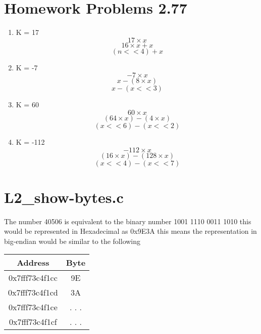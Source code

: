 \documentclass[11pt]{article}
\begin{document}
\section{Homework Problems 2.77}
    \begin{enumerate}
        \item K = 17 \newline
            $$17 \times x$$
            $$ 16 \times x + x $$
            $$ (n << 4) + x $$
        \item K = -7
            $$ -7 \times x $$
            $$ x - (8 \times x) $$
            $$ x - (x << 3) $$
        \item K = 60
            $$ 60 \times x $$
            $$ (64 \times x) - (4 \times x) $$
            $$ (x << 6) - (x << 2) $$
        \item K = -112
            $$ -112 \times x $$
            $$ (16 \times x) - (128 \times x) $$
            $$ (x << 4) - (x << 7) $$
    \end{enumerate}

\section{L2\_show-bytes.c}
    The number 40506 is equivalent to the binary number 1001 1110 0011 1010
    this would be represented in Hexadecimal as 0x9E3A this means the representation
    in big-endian would be similar to the following
    \newline\newline
    \begin{tabular}{c | c}
        \hline
        Address & Byte \\
        \hline
        0x7fff73c4f1cc & 9E\\
        0x7fff73c4f1cd & 3A\\
        0x7fff73c4f1ce & . . .\\
        0x7fff73c4f1cf & . . .\\
        
    \end{tabular}
\end{document}
